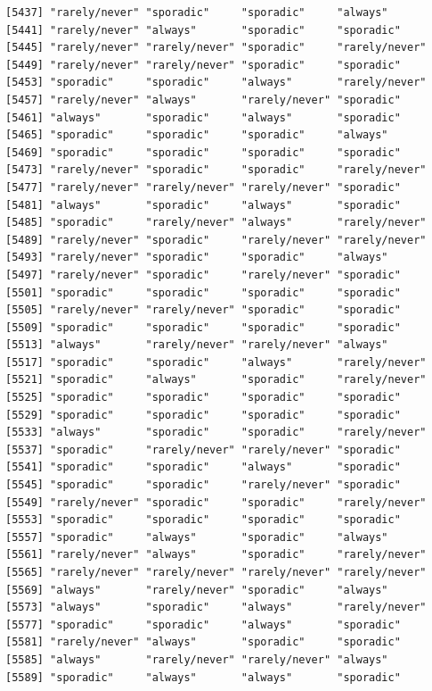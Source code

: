 \documentclass[
  letterpaper,
  DIV=11,
  numbers=noendperiod]{scrartcl}
\begin{document}
\begin{verbatim}
[5437] "rarely/never" "sporadic"     "sporadic"     "always"      
[5441] "rarely/never" "always"       "sporadic"     "sporadic"    
[5445] "rarely/never" "rarely/never" "sporadic"     "rarely/never"
[5449] "rarely/never" "rarely/never" "sporadic"     "sporadic"    
[5453] "sporadic"     "sporadic"     "always"       "rarely/never"
[5457] "rarely/never" "always"       "rarely/never" "sporadic"    
[5461] "always"       "sporadic"     "always"       "sporadic"    
[5465] "sporadic"     "sporadic"     "sporadic"     "always"      
[5469] "sporadic"     "sporadic"     "sporadic"     "sporadic"    
[5473] "rarely/never" "sporadic"     "sporadic"     "rarely/never"
[5477] "rarely/never" "rarely/never" "rarely/never" "sporadic"    
[5481] "always"       "sporadic"     "always"       "sporadic"    
[5485] "sporadic"     "rarely/never" "always"       "rarely/never"
[5489] "rarely/never" "sporadic"     "rarely/never" "rarely/never"
[5493] "rarely/never" "sporadic"     "sporadic"     "always"      
[5497] "rarely/never" "sporadic"     "rarely/never" "sporadic"    
[5501] "sporadic"     "sporadic"     "sporadic"     "sporadic"    
[5505] "rarely/never" "rarely/never" "sporadic"     "sporadic"    
[5509] "sporadic"     "sporadic"     "sporadic"     "sporadic"    
[5513] "always"       "rarely/never" "rarely/never" "always"      
[5517] "sporadic"     "sporadic"     "always"       "rarely/never"
[5521] "sporadic"     "always"       "sporadic"     "rarely/never"
[5525] "sporadic"     "sporadic"     "sporadic"     "sporadic"    
[5529] "sporadic"     "sporadic"     "sporadic"     "sporadic"    
[5533] "always"       "sporadic"     "sporadic"     "rarely/never"
[5537] "sporadic"     "rarely/never" "rarely/never" "sporadic"    
[5541] "sporadic"     "sporadic"     "always"       "sporadic"    
[5545] "sporadic"     "sporadic"     "rarely/never" "sporadic"    
[5549] "rarely/never" "sporadic"     "sporadic"     "rarely/never"
[5553] "sporadic"     "sporadic"     "sporadic"     "sporadic"    
[5557] "sporadic"     "always"       "sporadic"     "always"      
[5561] "rarely/never" "always"       "sporadic"     "rarely/never"
[5565] "rarely/never" "rarely/never" "rarely/never" "rarely/never"
[5569] "always"       "rarely/never" "sporadic"     "always"      
[5573] "always"       "sporadic"     "always"       "rarely/never"
[5577] "sporadic"     "sporadic"     "always"       "sporadic"    
[5581] "rarely/never" "always"       "sporadic"     "sporadic"    
[5585] "always"       "rarely/never" "rarely/never" "always"      
[5589] "sporadic"     "always"       "always"       "sporadic"    

\end{verbatim}
\end{document}
